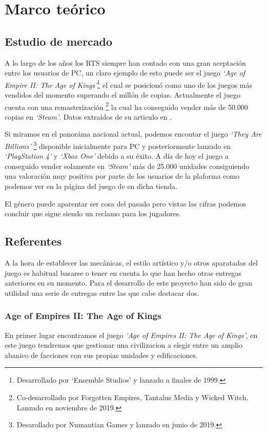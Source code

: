 \chapter{Marco teórico}
\label{Marco_teorico}

\section{Estudio de mercado}
A lo largo de los años los \ac{RTS} siempre han contado con una gran aceptación entre
los usuarios de \ac{PC}, un claro ejemplo de esto puede ser el juego \textit{`Age of
Empire II: The Age of Kings'}\footnote{Desarrollado por `Ensemble Studios' y lanzado a
finales de 1999.} el cual se posicionó como uno de los juegos más vendidos del momento
superando el millón de copias. Actualmente el juego cuenta con una remasterización
\footnote{Co-desarrollado por Forgotten Empires, Tantalus Media y Wicked
Witch. Lanzado en noviembre de 2019.} la cual ha conseguido vender más de 50.000
copias en \textit{`Steam'}. Datos extraídos de su articulo en \citeauthor*{Wiki_AoE2}.

Si miramos en el panoráma nacional actual, podemos encontar el juego \textit{`They Are
Billions'} \footnote{Desarollado por Numantian Games y lanzado en junio de 2019.}
disponible inicialmente para \ac{PC} y posteriormente lanzado en \textit{`PlayStation 4'}
y \textit{`Xbox One'} debido a su éxito. A día de hoy el juego a conseguido vender
solamente en \textit{`Steam'} más de 25.000 unidades consiguiendo una valoración muy
positiva por parte de los usuarios de la plaforma como podemos ver en la página 
del juego de \citeauthor*{TaB2019} en dicha tienda.

El género puede aparentar ser cosa del pasado pero vistas las cifras podemos concluir
que sigue siendo un reclamo para los jugadores.

\section{Referentes}
A la hora de establecer las mecánicas, el estilo artístico y/o otros aparatados del
juego es habitual basarse o tener en cuenta lo que han hecho otras entregas anteriores
en su momento. Para el desarrollo de este proyecto han sido de gran utilidad una
serie de entregas entre las que cabe destacar dos.

\subsection{Age of Empires II: The Age of Kings}
En primer lugar encontramos el juego \textit{'Age of Empires II: The Age of Kings'}, en
este juego tendremos que gestionar una civilizacion a elegir entre un amplio abanico de
facciones con sus propias unidades y edificaciones.

